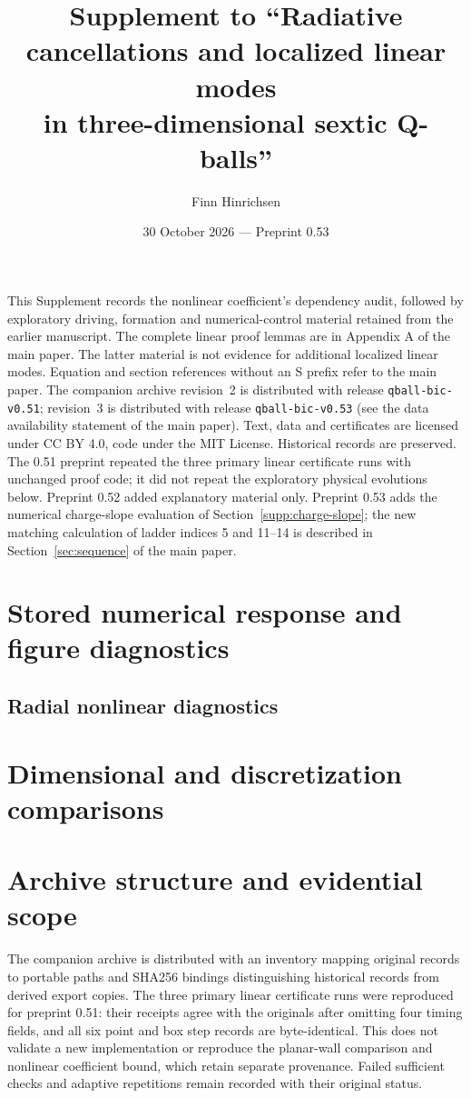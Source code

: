 \documentclass[a4paper,11pt]{article}
\title{Supplement to ``Radiative cancellations and localized linear modes\\in three-dimensional sextic Q-balls''}
\author{Finn Hinrichsen}
\date{30 October 2026 --- Preprint 0.53}
\begin{document}
\maketitle
This Supplement records the nonlinear coefficient's dependency audit,
followed by exploratory driving, formation and numerical-control
material retained from the earlier manuscript. The complete linear
proof lemmas are in Appendix A of the main paper.
The latter material is not evidence for additional localized linear modes.
Equation and section references without an S prefix refer to the main paper.
The companion archive revision~2 is distributed with release
\texttt{qball-bic-v0.51}; revision~3 is distributed with release
\texttt{qball-bic-v0.53} (see the data availability statement
of the main paper). Text, data and certificates are licensed under
CC BY 4.0, code under the MIT License.
Historical records are preserved. The 0.51 preprint
repeated the three primary linear certificate runs with unchanged proof
code; it did not repeat the exploratory physical evolutions below.
Preprint 0.52 added explanatory material only. Preprint 0.53 adds the
numerical charge-slope evaluation of Section~\ref{supp:charge-slope};
the new matching calculation of ladder indices 5 and 11--14 is
described in Section~\ref{sec:sequence} of the main paper.
\tableofcontents

\section{Stored numerical response and figure diagnostics}

\subsection{Radial nonlinear diagnostics}\label{supp:c0-evidence}


\section{Dimensional and discretization comparisons}



\clearpage

\clearpage

\clearpage

\clearpage

\section{Archive structure and evidential scope}\label{app:provenance}
The companion archive is distributed with an inventory mapping
original records to portable paths and SHA256 bindings distinguishing
historical records from derived export copies. The three primary linear
certificate runs were reproduced for preprint 0.51: their receipts agree
with the originals after omitting four timing fields, and all six point
and box step records are byte-identical. This does not validate a new
implementation or reproduce the planar-wall comparison and nonlinear
coefficient bound, which retain separate provenance. Failed sufficient
checks and adaptive repetitions remain recorded with their original status.
\end{document}
